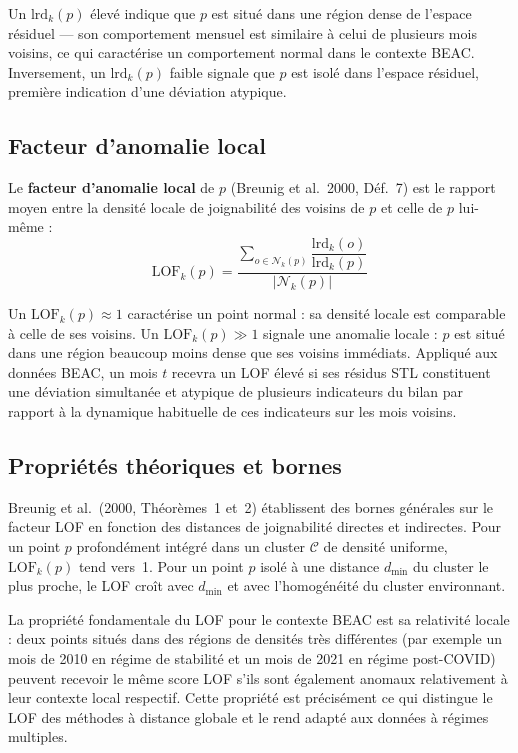\documentclass[12pt,a4paper]{article}
\begin{document}
Un $\mathrm{lrd}_k(p)$ élevé indique que $p$ est situé dans une région dense
de l'espace résiduel --- son comportement mensuel est similaire à celui de
plusieurs mois voisins, ce qui caractérise un comportement normal dans le
contexte BEAC. Inversement, un $\mathrm{lrd}_k(p)$ faible signale que $p$ est
isolé dans l'espace résiduel, première indication d'une déviation atypique.

\subsection{Facteur d'anomalie local}

Le \textbf{facteur d'anomalie local} de $p$ (Breunig et al.\ 2000, Déf.~7)
est le rapport moyen entre la densité locale de joignabilité des voisins de
$p$ et celle de $p$ lui-même :
$$\mathrm{LOF}_k(p) =
\frac{\displaystyle\sum_{o \in \mathcal{N}_k(p)}
\dfrac{\mathrm{lrd}_k(o)}{\mathrm{lrd}_k(p)}}
{\left|\mathcal{N}_k(p)\right|}$$

Un $\mathrm{LOF}_k(p) \approx 1$ caractérise un point normal : sa densité
locale est comparable à celle de ses voisins. Un $\mathrm{LOF}_k(p) \gg 1$
signale une anomalie locale : $p$ est situé dans une région beaucoup moins
dense que ses voisins immédiats. Appliqué aux données BEAC, un mois $t$
recevra un LOF élevé si ses résidus STL constituent une déviation simultanée
et atypique de plusieurs indicateurs du bilan par rapport à la dynamique
habituelle de ces indicateurs sur les mois voisins.

\subsection{Propriétés théoriques et bornes}

Breunig et al.\ (2000, Théorèmes~1 et~2) établissent des bornes générales
sur le facteur LOF en fonction des distances de joignabilité directes et
indirectes. Pour un point $p$ profondément intégré dans un cluster
$\mathcal{C}$ de densité uniforme, $\mathrm{LOF}_k(p)$ tend vers~1. Pour un
point $p$ isolé à une distance $d_{\min}$ du cluster le plus proche, le LOF
croît avec $d_{\min}$ et avec l'homogénéité du cluster environnant.

La propriété fondamentale du LOF pour le contexte BEAC est sa relativité
locale : deux points situés dans des régions de densités très différentes
(par exemple un mois de 2010 en régime de stabilité et un mois de 2021 en
régime post-COVID) peuvent recevoir le même score LOF s'ils sont également
anomaux relativement à leur contexte local respectif. Cette propriété est
précisément ce qui distingue le LOF des méthodes à distance globale et le
rend adapté aux données à régimes multiples.
\end{document}
